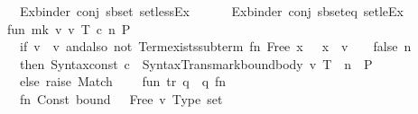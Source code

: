 \begin{isabellebody}
\ \ \ \ \ \ {\isacharparenleft}{\kern0pt}{\isacharparenleft}{\kern0pt}Ex{\isacharunderscore}{\kern0pt}binder{\isacharcomma}{\kern0pt}\ conj{\isacharcomma}{\kern0pt}\ sbset{\isacharparenright}{\kern0pt}{\isacharcomma}{\kern0pt}\ \isactrlsyntaxUNDERSCOREconst {\isasymopen}{\isacharunderscore}{\kern0pt}setlessEx{\isasymclose}{\isacharparenright}{\kern0pt}{\isacharcomma}{\kern0pt}\isanewline
\ \ \ \ \ \ {\isacharparenleft}{\kern0pt}{\isacharparenleft}{\kern0pt}Ex{\isacharunderscore}{\kern0pt}binder{\isacharcomma}{\kern0pt}\ conj{\isacharcomma}{\kern0pt}\ sbset{\isacharunderscore}{\kern0pt}eq{\isacharparenright}{\kern0pt}{\isacharcomma}{\kern0pt}\ \isactrlsyntaxUNDERSCOREconst {\isasymopen}{\isacharunderscore}{\kern0pt}setleEx{\isasymclose}{\isacharparenright}{\kern0pt}{\isacharbrackright}{\kern0pt}{\isacharsemicolon}{\kern0pt}\isanewline
\isanewline
\ \ \ \ fun\ mk\ v\ {\isacharparenleft}{\kern0pt}v{\isacharprime}{\kern0pt}{\isacharcomma}{\kern0pt}\ T{\isacharparenright}{\kern0pt}\ c\ n\ P\ {\isacharequal}{\kern0pt}\isanewline
\ \ \ \ \ \ if\ v\ {\isacharequal}{\kern0pt}\ v{\isacharprime}{\kern0pt}\ andalso\ not\ {\isacharparenleft}{\kern0pt}Term{\isachardot}{\kern0pt}exists{\isacharunderscore}{\kern0pt}subterm\ {\isacharparenleft}{\kern0pt}fn\ Free\ {\isacharparenleft}{\kern0pt}x{\isacharcomma}{\kern0pt}\ {\isacharunderscore}{\kern0pt}{\isacharparenright}{\kern0pt}\ {\isacharequal}{\kern0pt}{\isachargreater}{\kern0pt}\ x\ {\isacharequal}{\kern0pt}\ v\ {\isacharbar}{\kern0pt}\ {\isacharunderscore}{\kern0pt}\ {\isacharequal}{\kern0pt}{\isachargreater}{\kern0pt}\ false{\isacharparenright}{\kern0pt}\ n{\isacharparenright}{\kern0pt}\isanewline
\ \ \ \ \ \ then\ Syntax{\isachardot}{\kern0pt}const\ c\ {\isachardollar}{\kern0pt}\ Syntax{\isacharunderscore}{\kern0pt}Trans{\isachardot}{\kern0pt}mark{\isacharunderscore}{\kern0pt}bound{\isacharunderscore}{\kern0pt}body\ {\isacharparenleft}{\kern0pt}v{\isacharprime}{\kern0pt}{\isacharcomma}{\kern0pt}\ T{\isacharparenright}{\kern0pt}\ {\isachardollar}{\kern0pt}\ n\ {\isachardollar}{\kern0pt}\ P\isanewline
\ \ \ \ \ \ else\ raise\ Match{\isacharsemicolon}{\kern0pt}\isanewline
\isanewline
\ \ \ \ fun\ tr{\isacharprime}{\kern0pt}\ q\ {\isacharequal}{\kern0pt}\ {\isacharparenleft}{\kern0pt}q{\isacharcomma}{\kern0pt}\ fn\ {\isacharunderscore}{\kern0pt}\ {\isacharequal}{\kern0pt}{\isachargreater}{\kern0pt}\isanewline
\ \ \ \ \ \ {\isacharparenleft}{\kern0pt}fn\ {\isacharbrackleft}{\kern0pt}Const\ {\isacharparenleft}{\kern0pt}\isactrlsyntaxUNDERSCOREconst {\isasymopen}{\isacharunderscore}{\kern0pt}bound{\isasymclose}{\isacharcomma}{\kern0pt}\ {\isacharunderscore}{\kern0pt}{\isacharparenright}{\kern0pt}\ {\isachardollar}{\kern0pt}\ Free\ {\isacharparenleft}{\kern0pt}v{\isacharcomma}{\kern0pt}\ Type\ {\isacharparenleft}{\kern0pt}\isactrltypeUNDERSCOREname {\isasymopen}set{\isasymclose}{\isacharcomma}{\kern0pt}\ {\isacharunderscore}{\kern0pt}{\isacharparenright}{\kern0pt}{\isacharparenright}{\kern0pt}{\isacharcomma}{\kern0pt}\isanewline

\end{isabellebody}
